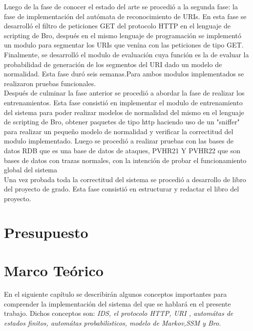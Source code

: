 \documentclass{article}
\begin{document}
Luego de la fase de conocer el estado del arte se procedi\'o a la segunda fase: la fase de implementaci\'on del aut\'omata de reconocimiento de URIs. En esta fase se desarroll\'o el filtro de peticiones GET del protocolo HTTP en el lenguaje de scripting de Bro, despu\'es en el mismo lenguaje de programaci\'on se implement\'o un modulo para segmentar los URIs que ven\'ina con las peticiones de tipo GET. Finalmente, se desarroll\'o el modulo de evaluaci\'on cuya funci\'on es la de evaluar la probabilidad de generaci\'on de los segmentos del URI dado un modelo de normalidad. Esta fase dur\'o seis semanas.Para ambos modulos implementados se realizaron pruebas funcionales.\\

Despu\'es de culminar la fase anterior se procedi\'o a abordar la fase de realizar los entrenamientos. Esta fase consisti\'o en implementar el modulo de entrenamiento del sistema para poder realizar modelos de normalidad del mismo en el lenguaje de scripting de Bro, obtener paquetes de tipo http haciendo uso de un "sniffer" para realizar un pequeño modelo de normalidad y verificar la correctitud del modulo implementado. Luego se procedi\'o a realizar pruebas con las bases de datos RDB que es una base de datos de ataques, PVHR21 Y PVHR22 que son bases de datos con trazas normales, con la intenci\'on de probar el funcionamiento global del sistema\\

Una vez probada toda la correctitud del sistema se procedi\'o a desarrollo de libro del proyecto de grado. Esta fase consisti\'o en estructurar y redactar el libro del proyecto.

\section{Presupuesto}



\section{Marco Te\'orico}

En el siguiente cap\'itulo se describir\'an algunos conceptos importantes para comprender la implementaci\'on del sistema del que se hablar\'a en el presente trabajo. Dichos conceptos son: \textit{IDS, el protocolo HTTP, URI , autom\'atas de estados finitos, autom\'atas probabilisticos, modelo de Markov,SSM y Bro}.\\
\end{document}
